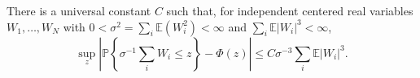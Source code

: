 There is a universal constant \(C\) such that, for independent centered real variables \(W_1,\ldots,W_N\) with \(0<\sigma^2=\sum_i\mathbb E(W_i^2)<\infty\) and \(\sum_i\mathbb E|W_i|^3<\infty\),
\[
\sup_z\left|\mathbb P\left\{\sigma^{-1}\sum_iW_i\le z\right\}-\Phi(z)\right|
\le C\sigma^{-3}\sum_i\mathbb E|W_i|^3.
\]